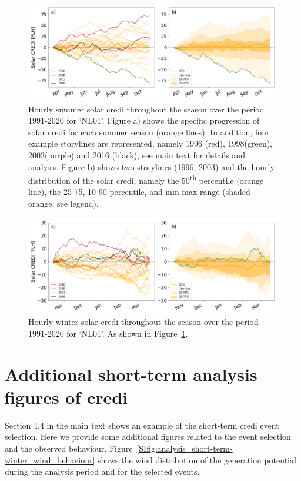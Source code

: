 \documentclass[a4paper,11pt]{extarticle}
\newcommand{\ts}[1]{\textsuperscript{#1}}
\newcommand{\credi}[0]{{\sc credi}}
\newcommand{\sdi}[0]{{\sc solar credi}}
\begin{document}
\begin{figure}[ht!]
    \centering
    \includegraphics[width=\textwidth]{SolarCREDI_seasonal-summer}
    \caption{
    Hourly summer \sdi{} throughout the season over the period 1991-2020 for `NL01'.
    Figure a) shows the specific progression of \sdi{} for each summer season (orange lines).
    In addition, four example storylines are represented, namely 1996 (red), 1998(green), 2003(purple) and 2016 (black), see main text for details and analysis.
    Figure b) shows two storylines (1996, 2003) and the hourly distribution of the \sdi{}, namely the 50\ts{th} percentile (orange line), the 25-75, 10-90 percentile, and min-max range (shaded orange, see legend). 
    }
    \label{SIfig:analysis_season-summer_solar}
\end{figure}
\begin{figure}[h!]
    \centering
    \includegraphics[width=\textwidth]{SolarCREDI_seasonal-winter}
    \caption{
    Hourly winter \sdi{} throughout the season over the period 1991-2020 for `NL01'.
    As shown in Figure~\ref{SIfig:analysis_season-summer_solar}.
    }
    \label{SIfig:analysis_season-winter_solar}
\end{figure}



\clearpage
\section{Additional short-term analysis figures of \credi}\label{app:shortterm}
Section 4.4 in the main text shows an example of the short-term \credi{} event selection.
Here we provide some additional figures related to the event selection and the observed behaviour.  
Figure~\ref{SIfig:analysis_short-term-winter_wind_behaviour} shows the wind distribution of the generation potential during the analysis period and for the selected events.
\end{document}
